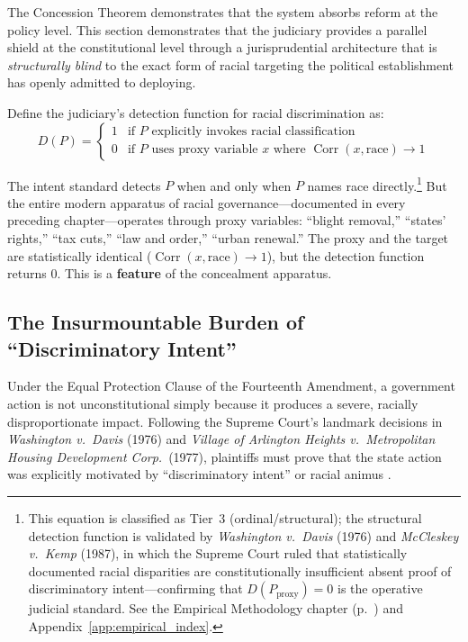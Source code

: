 The Concession Theorem demonstrates that the system absorbs reform at the policy level. This section demonstrates that the judiciary provides a parallel shield at the constitutional level through a jurisprudential architecture that is \textit{structurally blind} to the exact form of racial targeting the political establishment has openly admitted to deploying.

Define the judiciary's detection function for racial discrimination as:
\begin{equation}\label{eq:12.3-judiciary-discrimination-detection}
D(P) = \begin{cases}
1 & \text{if } P \text{ explicitly invokes racial classification} \\
0 & \text{if } P \text{ uses proxy variable } x \text{ where } \operatorname{Corr}(x, \text{race}) \to 1
\end{cases}
\end{equation}

The intent standard detects $P$ when and only when $P$ names race directly.\footnote{This equation is classified as Tier~3 (ordinal/structural); the structural detection function is validated by \textit{Washington v.\ Davis} (1976) and \textit{McCleskey v.\ Kemp} (1987), in which the Supreme Court ruled that statistically documented racial disparities are constitutionally insufficient absent proof of discriminatory intent---confirming that $D(P_{\text{proxy}}) = 0$ is the operative judicial standard. See the Empirical Methodology chapter (p.~\pageref{ch:empirical_methodology}) and Appendix~\ref{app:empirical_index}.} But the entire modern apparatus of racial governance---documented in every preceding chapter---operates through proxy variables: ``blight removal,'' ``states' rights,'' ``tax cuts,'' ``law and order,'' ``urban renewal.'' The proxy and the target are statistically identical ($\operatorname{Corr}(x, \text{race}) \to 1$), but the detection function returns 0. This is a \textbf{feature} of the concealment apparatus.

\subsection{The Insurmountable Burden of ``Discriminatory Intent''}

Under the Equal Protection Clause of the Fourteenth Amendment, a government action is not unconstitutional simply because it produces a severe, racially disproportionate impact. Following the Supreme Court's landmark decisions in \textit{Washington v.\ Davis} (1976) and \textit{Village of Arlington Heights v.\ Metropolitan Housing Development Corp.}\ (1977), plaintiffs must prove that the state action was explicitly motivated by ``discriminatory intent'' or racial animus \cite{tel_wash_v_davis, tel_arlington_heights}.

